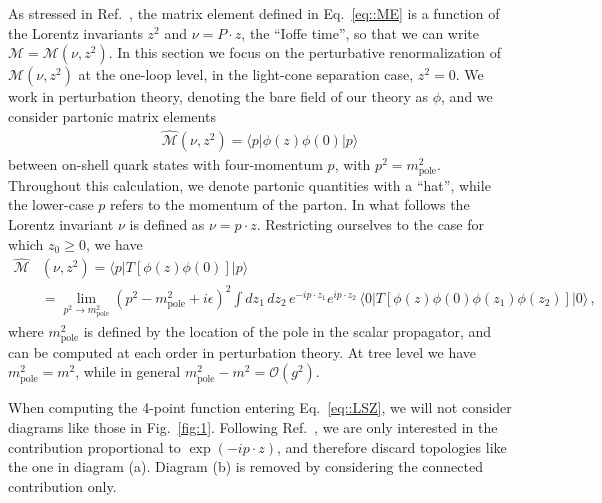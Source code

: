 As stressed in Ref.~\cite{Radyushkin:2017cyf}, the matrix element defined in
Eq.~\eqref{eq::ME} is a function of the Lorentz invariants $z^2$ and $\nu =
P\cdot z$, the ``Ioffe time'', so that we can write
$\mathcal{M}=\mathcal{M}\left(\nu,z^2\right)$. In this section we focus on the
perturbative renormalization of $\mathcal{M}\left(\nu,z^2\right)$ at the
one-loop level, in the light-cone separation case, $z^2=0$. 
%
We work in perturbation theory, denoting the bare field of our theory as $\phi$,
and we consider partonic matrix elements
\begin{align}
\label{eq::MEpartonic}
        \widehat{\mathcal{M}}\left(\nu,z^2\right) = \langle p | \phi\left(z\right)\phi\left(0\right)  | p \rangle
\end{align}
between on-shell quark states with four-momentum $p$, with $p^2 =
m_\mathrm{pole}^2$. Throughout this calculation, we denote partonic quantities
with a ``hat'', while the lower-case $p$ refers to the momentum of the parton.
In what follows the Lorentz invariant $\nu$ is defined as $\nu=p\cdot z$.
Restricting ourselves to the case for which $z_0 \geqslant 0 $, we have
\begin{align}
\label{eq::LSZ}
        \widehat{\mathcal{M}}&\left(\nu, z^2\right)=\langle p |T\left[\phi\left(z\right)\phi\left(0\right)\right]|p\rangle  \nonumber \\
        & = \lim_{p^2\rightarrow m^2_{\text{pole}}}\left(p^2-m^2_{\text{pole}} + i\epsilon\right)^2 
        \int dz_1\,dz_2 \,e^{-ip\cdot z_1}e^{ip\cdot z_2}\,
        \langle 0 | T\left[\phi\left(z\right)\phi\left(0\right)\phi\left(z_1\right)\phi\left(z_2\right)\right]|0\rangle\, ,
\end{align}
where $m_\mathrm{pole}^2$ is defined by the location of the pole in the scalar
propagator, and can be computed at each order in perturbation theory. At tree
level we have $m_\mathrm{pole}^2 = m^2$, while in general $m_\mathrm{pole}^2 - m^2 = \mathcal{O}\left(g^2\right)$.

When computing the 4-point function entering Eq.~\eqref{eq::LSZ}, we will not
consider diagrams like those in Fig.~\ref{fig:1}. Following
Ref.~\cite{Collins:1980ui}, we are only interested in the contribution
proportional to $\exp(-ip\cdot z)$, and therefore discard topologies like the
one in diagram (a). Diagram (b) is removed by considering the connected
contribution only. 

\setlength{\feynhanddotsize}{1.3truemm}

